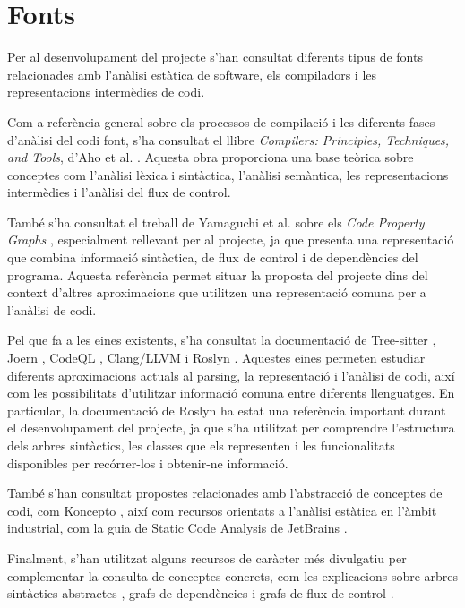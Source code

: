 \section*{Fonts}

Per al desenvolupament del projecte s'han consultat diferents tipus de fonts relacionades amb l'anàlisi estàtica de software, els compiladors i les representacions intermèdies de codi.

Com a referència general sobre els processos de compilació i les diferents fases d'anàlisi del codi font, s'ha consultat el llibre \textit{Compilers: Principles, Techniques, and Tools}, d'Aho et al. \cite{aho_compilers}. Aquesta obra proporciona una base teòrica sobre conceptes com l'anàlisi lèxica i sintàctica, l'anàlisi semàntica, les representacions intermèdies i l'anàlisi del flux de control.

També s'ha consultat el treball de Yamaguchi et al. sobre els \textit{Code Property Graphs} \cite{yamaguchi_cpg}, especialment rellevant per al projecte, ja que presenta una representació que combina informació sintàctica, de flux de control i de dependències del programa. Aquesta referència permet situar la proposta del projecte dins del context d'altres aproximacions que utilitzen una representació comuna per a l'anàlisi de codi.

Pel que fa a les eines existents, s'ha consultat la documentació de Tree-sitter \cite{tree_sitter}, Joern \cite{joern_cpg}, CodeQL \cite{codeql}, Clang/LLVM \cite{clang_llvm} i Roslyn \cite{roslyn}. Aquestes eines permeten estudiar diferents aproximacions actuals al parsing, la representació i l'anàlisi de codi, així com les possibilitats d'utilitzar informació comuna entre diferents llenguatges. En particular, la documentació de Roslyn ha estat una referència important durant el desenvolupament del projecte, ja que s'ha utilitzat per comprendre l'estructura dels arbres sintàctics, les classes que els representen i les funcionalitats disponibles per recórrer-los i obtenir-ne informació.

També s'han consultat propostes relacionades amb l'abstracció de conceptes de codi, com Koncepto \cite{koncepto}, així com recursos orientats a l'anàlisi estàtica en l'àmbit industrial, com la guia de Static Code Analysis de JetBrains \cite{static_code_analysis_jetbrains}.

Finalment, s'han utilitzat alguns recursos de caràcter més divulgatiu per complementar la consulta de conceptes concrets, com les explicacions sobre arbres sintàctics abstractes \cite{balapriya_ast}, grafs de dependències \cite{gfg_dependencygraph} i grafs de flux de control \cite{gfg_controlflowgraph}.

\printbibliography